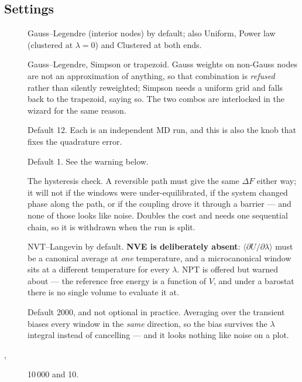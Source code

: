 \subsection{Settings}

\begin{description}
  \item[] Gauss--Legendre (interior nodes) by default;
    also Uniform, Power law (clustered at $\lambda = 0$) and Clustered at both
    ends.
  \item[] Gauss--Legendre, Simpson or trapezoid. Gauss weights on
    non-Gauss nodes are not an approximation of anything, so that combination is
    \emph{refused} rather than silently reweighted; Simpson needs a uniform grid
    and falls back to the trapezoid, saying so. The two combos are interlocked
    in the wizard for the same reason.
  \item[] Default 12. Each is an independent MD run, and
    this is also the knob that fixes the quadrature error.
  \item[] Default 1. See the warning below.
  \item[] The hysteresis check. A reversible
    path must give the same $\Delta F$ either way; it will not if the windows
    were under-equilibrated, if the system changed phase along the path, or if
    the coupling drove it through a barrier --- and none of those looks like
    noise. Doubles the cost and needs one sequential chain, so it is withdrawn
    when the run is split.
  \item[] NVT--Langevin by default. \textbf{NVE is deliberately
    absent}: $\langle\partial U/\partial\lambda\rangle$ must be a canonical
    average at \emph{one} temperature, and a microcanonical window sits at a
    different temperature for every $\lambda$. NPT is offered but warned about
    --- the reference free energy is a function of $V$, and under a barostat
    there is no single volume to evaluate it at.
  \item[] Default 2000, and not optional in
    practice. Averaging over the transient biases every window in the
    \emph{same} direction, so the bias survives the $\lambda$ integral instead
    of cancelling --- and it looks nothing like noise on a plot.
  \item[, ] 10\,000 and 10.
\end{description}

